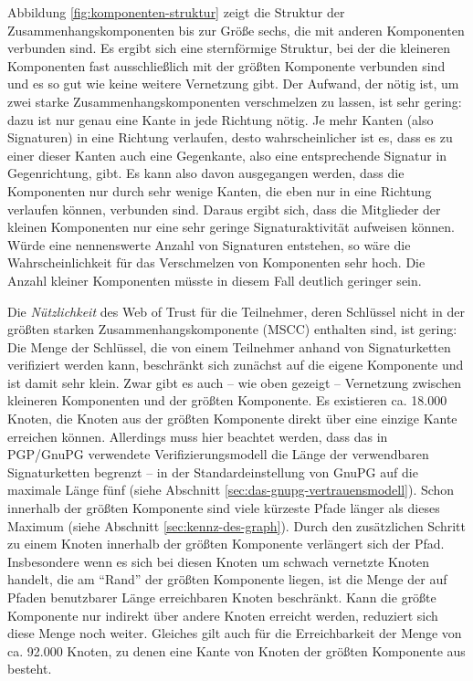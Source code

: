 Abbildung \ref{fig:komponenten-struktur} zeigt die Struktur der
Zusammenhangskomponenten bis zur Größe sechs, die mit anderen
Komponenten verbunden sind. Es ergibt sich eine sternförmige
Struktur, bei der die kleineren Komponenten fast ausschließlich mit
der größten Komponente verbunden sind und es so gut wie keine
weitere Vernetzung gibt. Der Aufwand, der nötig ist, um zwei starke
Zusammenhangskomponenten verschmelzen zu lassen, ist sehr gering: dazu
ist nur genau eine Kante in jede Richtung nötig. Je mehr Kanten
(also Signaturen) in eine Richtung verlaufen, desto wahrscheinlicher
ist es, dass es zu einer dieser Kanten auch eine Gegenkante, also eine
entsprechende Signatur in Gegenrichtung, gibt. Es kann also davon
ausgegangen werden, dass die Komponenten nur durch sehr wenige Kanten,
die eben nur in eine Richtung verlaufen können, verbunden
sind. Daraus ergibt sich, dass die Mitglieder der kleinen Komponenten
nur eine sehr geringe Signaturaktivität aufweisen können. Würde
eine nennenswerte Anzahl von Signaturen entstehen, so wäre die
Wahrscheinlichkeit für das Verschmelzen von Komponenten sehr
hoch. Die Anzahl kleiner Komponenten müsste in diesem Fall deutlich
geringer sein.

Die \emph{Nützlichkeit} des Web of Trust für die Teilnehmer, deren
Schlüssel nicht in der größten starken Zusammenhangskomponente
(MSCC)
enthalten sind, ist gering: Die Menge der Schlüssel, die von einem
Teilnehmer anhand von Signaturketten verifiziert werden kann,
beschränkt sich zunächst auf die eigene Komponente und ist damit
sehr klein. Zwar gibt es auch -- wie oben gezeigt -- Vernetzung
zwischen kleineren Komponenten und der größten Komponente. Es
existieren ca. 18.000 Knoten, die Knoten aus der größten Komponente
direkt über eine einzige Kante erreichen können. Allerdings muss
hier beachtet werden, dass das in PGP/GnuPG verwendete
Verifizierungsmodell die Länge der verwendbaren Signaturketten
begrenzt -- in der Standardeinstellung von GnuPG auf die maximale
Länge fünf (siehe Abschnitt
\ref{sec:das-gnupg-vertrauensmodell}). Schon innerhalb der größten
Komponente sind viele kürzeste Pfade länger als dieses Maximum
(siehe Abschnitt \ref{sec:kennz-des-graph}). Durch den zusätzlichen
Schritt zu einem Knoten innerhalb der größten Komponente
verlängert sich der Pfad. Insbesondere wenn es sich bei diesen
Knoten um schwach vernetzte Knoten handelt, die am "`Rand"' der
größten Komponente liegen, ist die Menge der auf Pfaden benutzbarer
Länge erreichbaren Knoten beschränkt. Kann die größte
Komponente nur indirekt über andere Knoten erreicht werden,
reduziert sich diese Menge noch weiter. Gleiches gilt auch für die
Erreichbarkeit der Menge von ca. 92.000 Knoten, zu denen eine Kante von
Knoten der größten Komponente aus besteht. 

